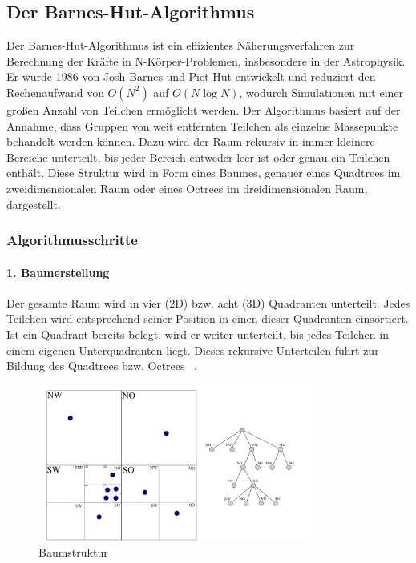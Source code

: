 \documentclass[a4paper,12pt,twoside]{article}
\begin{document}
\subsection{Der Barnes-Hut-Algorithmus}
Der Barnes-Hut-Algorithmus ist ein effizientes Näherungsverfahren zur Berechnung der Kräfte in N-Körper-Problemen, insbesondere in der Astrophysik. Er wurde 1986 von Josh Barnes und Piet Hut entwickelt und reduziert den Rechenaufwand von $O(N^2)$ auf $O(N \log N)$, wodurch Simulationen mit einer großen Anzahl von Teilchen ermöglicht werden.
Der Algorithmus basiert auf der Annahme, dass Gruppen von weit entfernten Teilchen als einzelne Massepunkte behandelt werden können. Dazu wird der Raum rekursiv in immer kleinere Bereiche unterteilt, bis jeder Bereich entweder leer ist oder genau ein Teilchen enthält. Diese Struktur wird in Form eines Baumes, genauer eines Quadtrees im zweidimensionalen Raum oder eines Octrees im dreidimensionalen Raum, dargestellt.

\subsubsection{Algorithmusschritte}

\paragraph{1. Baumerstellung}
Der gesamte Raum wird in vier (2D) bzw. acht (3D) Quadranten unterteilt. Jedes Teilchen wird entsprechend seiner Position in einen dieser Quadranten einsortiert. Ist ein Quadrant bereits belegt, wird er weiter unterteilt, bis jedes Teilchen in einem eigenen Unterquadranten liegt. Dieses rekursive Unterteilen führt zur Bildung des Quadtrees bzw. Octrees ~\cite{Wu2024}.

\begin{figure}[H]
	\centering
	\includegraphics[width=0.8\textwidth]{Baumstruktur.png}
	\caption[Eintrag in Abbildungsverzeichnis von Grumpy Cat]{Baumstruktur}
	\label{Baumstruktur .}
\end{figure}
\end{document}
